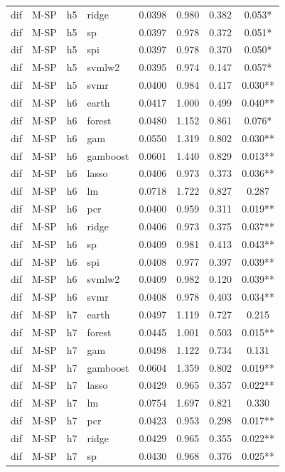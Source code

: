 \begin{ThreePartTable}
\begin{longtable}[t]{llclcccc}
dif & M-SP & h5 & ridge & 0.0398 & 0.980 & 0.382 & 0.053*\\
dif & M-SP & h5 & sp & 0.0397 & 0.978 & 0.372 & 0.051*\\
dif & M-SP & h5 & spi & 0.0397 & 0.978 & 0.370 & 0.050*\\
dif & M-SP & h5 & svmlw2 & 0.0395 & 0.974 & 0.147 & 0.057*\\
dif & M-SP & h5 & svmr & 0.0400 & 0.984 & 0.417 & 0.030**\\
\addlinespace
dif & M-SP & h6 & earth & 0.0417 & 1.000 & 0.499 & 0.040**\\
dif & M-SP & h6 & forest & 0.0480 & 1.152 & 0.861 & 0.076*\\
dif & M-SP & h6 & gam & 0.0550 & 1.319 & 0.802 & 0.030**\\
dif & M-SP & h6 & gamboost & 0.0601 & 1.440 & 0.829 & 0.013**\\
dif & M-SP & h6 & lasso & 0.0406 & 0.973 & 0.373 & 0.036**\\
dif & M-SP & h6 & lm & 0.0718 & 1.722 & 0.827 & 0.287\\
dif & M-SP & h6 & pcr & 0.0400 & 0.959 & 0.311 & 0.019**\\
dif & M-SP & h6 & ridge & 0.0406 & 0.973 & 0.375 & 0.037**\\
dif & M-SP & h6 & sp & 0.0409 & 0.981 & 0.413 & 0.043**\\
dif & M-SP & h6 & spi & 0.0408 & 0.977 & 0.397 & 0.039**\\
dif & M-SP & h6 & svmlw2 & 0.0409 & 0.982 & 0.120 & 0.039**\\
dif & M-SP & h6 & svmr & 0.0408 & 0.978 & 0.403 & 0.034**\\
\addlinespace
dif & M-SP & h7 & earth & 0.0497 & 1.119 & 0.727 & 0.215\\
dif & M-SP & h7 & forest & 0.0445 & 1.001 & 0.503 & 0.015**\\
dif & M-SP & h7 & gam & 0.0498 & 1.122 & 0.734 & 0.131\\
dif & M-SP & h7 & gamboost & 0.0604 & 1.359 & 0.802 & 0.019**\\
dif & M-SP & h7 & lasso & 0.0429 & 0.965 & 0.357 & 0.022**\\
dif & M-SP & h7 & lm & 0.0754 & 1.697 & 0.821 & 0.330\\
dif & M-SP & h7 & pcr & 0.0423 & 0.953 & 0.298 & 0.017**\\
dif & M-SP & h7 & ridge & 0.0429 & 0.965 & 0.355 & 0.022**\\
dif & M-SP & h7 & sp & 0.0430 & 0.968 & 0.376 & 0.025**\\

\end{longtable}
\end{ThreePartTable}
